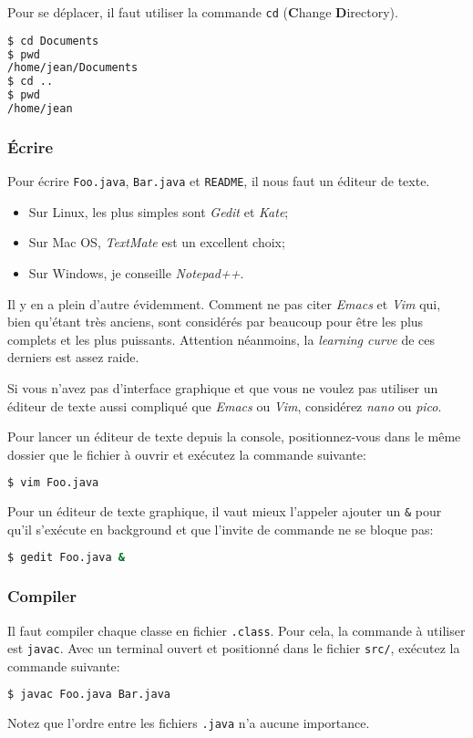 Pour se déplacer, il faut utiliser la commande
\verb|cd| (\textbf{C}hange \textbf{D}irectory).
\begin{lstlisting}[language={sh}, morekeywords={xx}]
$ cd Documents
$ pwd
/home/jean/Documents
$ cd ..
$ pwd
/home/jean
\end{lstlisting}

\subsubsection{Écrire}
Pour écrire \verb|Foo.java|, \verb|Bar.java| et \verb|README|,
il nous faut un éditeur de texte.

\begin{itemize}
  \item Sur Linux, les plus simples sont {\em Gedit} et {\em Kate};
  \item Sur Mac OS, {\em TextMate} est un excellent choix;
  \item Sur Windows, je conseille {\em Notepad++}.
\end{itemize}

Il y en a plein d'autre évidemment. Comment ne pas citer {\em Emacs} et
{\em Vim} qui, bien qu'étant très anciens, sont considérés par beaucoup
pour être les plus complets et les plus puissants.
Attention néanmoins, la {\em learning curve} de ces derniers est assez raide.

Si vous n'avez pas d'interface graphique et que vous ne voulez pas utiliser
un éditeur de texte aussi compliqué que {\em Emacs} ou {\em Vim}, considérez
{\em nano} ou {\em pico}.

Pour lancer un éditeur de texte depuis la console,
positionnez-vous dans le même dossier que le fichier à ouvrir
et exécutez la commande suivante:
\begin{lstlisting}[language={sh}, morekeywords={vim}]
$ vim Foo.java
\end{lstlisting}
Pour un éditeur de texte graphique,
il vaut mieux l'appeler ajouter un \verb|&| pour qu'il s'exécute en
background et que l'invite de commande ne se bloque pas:

\begin{lstlisting}[language={sh}, morekeywords={gedit}]
$ gedit Foo.java &
\end{lstlisting}

\subsubsection{Compiler}
Il faut compiler chaque classe en fichier \verb|.class|.
Pour cela, la commande à utiliser est \verb|javac|.
Avec un terminal ouvert et positionné dans le fichier \verb|src/|,
exécutez la commande suivante:
\begin{lstlisting}[language={sh}, morekeywords={javac}]
$ javac Foo.java Bar.java
\end{lstlisting}
Notez que l'ordre entre les fichiers \verb|.java| n'a aucune importance.

